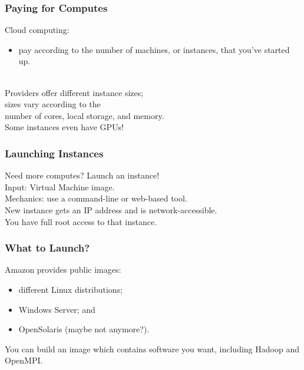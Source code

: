 \begin{frame}
  \frametitle{Paying for Computes}

  
Cloud computing:
\begin{itemize}
\item pay according to the number of machines, or
instances, that you've started up.
\end{itemize}
~\\[1em]

Providers offer different instance
sizes;\\
\qquad sizes vary according to the \\ \qquad number of cores, local
storage, and memory.\\[1em]

Some instances even have GPUs!
  
\end{frame}

\begin{frame}
  \frametitle{Launching Instances}

  
Need more computes? Launch an instance!\\[1em]

Input: Virtual Machine image.\\[1em]

Mechanics: use a command-line or web-based tool.\\[1em]

New instance gets an IP address and is network-accessible. \\
You have full root access to that instance.
  
\end{frame}

\begin{frame}
  \frametitle{What to Launch?}

  
Amazon provides public images:
\begin{itemize}
\item different Linux distributions;
\item Windows Server; and
\item OpenSolaris (maybe not anymore?). 
\end{itemize}

You can build an image which contains software you
want, including Hadoop and OpenMPI.
  
\end{frame}

